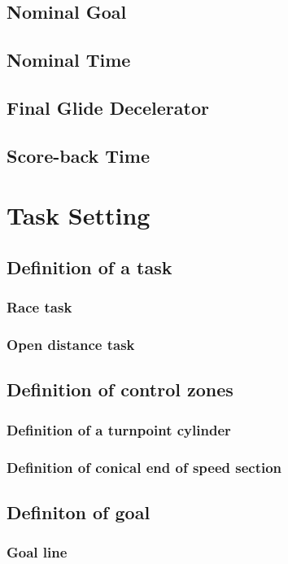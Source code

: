 \documentclass{article}
\begin{document}
\subsection{Nominal Goal}
\subsection{Nominal Time}
\subsection{Final Glide Decelerator}
\label{sec:final-glide-decelerators}
\subsection{Score-back Time}

\newpage
\section{Task Setting}
\subsection{Definition of a task}
\subsubsection{Race task}
\subsubsection{Open distance task}
\subsection{Definition of control zones}
\subsubsection{Definition of a turnpoint cylinder}
\subsubsection{Definition of conical end of speed section}
\subsection{Definiton of goal}
\subsubsection{Goal line}
\end{document}
